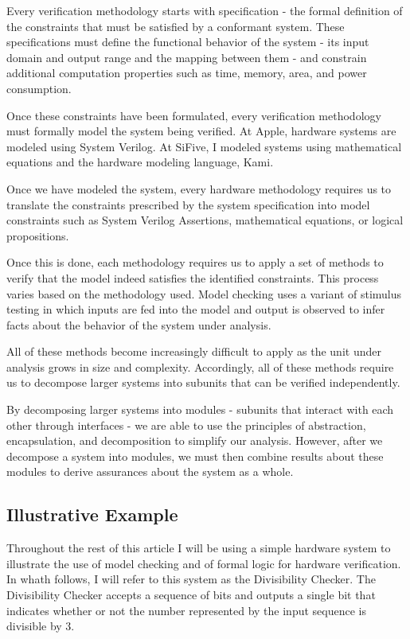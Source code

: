 \documentclass[10pt,a4paper]{article}
\begin{document}
Every verification methodology starts with specification - the formal definition of the constraints that must be satisfied by a conformant system. These specifications must define the functional behavior of the system - its input domain and output range and the mapping between them - and constrain additional computation properties such as time, memory, area, and power consumption.

Once these constraints have been formulated, every verification methodology must formally model the system being verified. At Apple, hardware systems are modeled using System Verilog. At SiFive, I modeled systems using mathematical equations and the hardware modeling language, Kami.

Once we have modeled the system, every hardware methodology requires us to translate the constraints prescribed by the system specification into model constraints such as System Verilog Assertions, mathematical equations, or logical propositions. 

Once this is done, each methodology requires us to apply a set of methods to verify that the model indeed satisfies the identified constraints. This process varies based on the methodology used. Model checking uses a variant of stimulus testing in which inputs are fed into the model and output is observed to infer facts about the behavior of the system under analysis.

All of these methods become increasingly difficult to apply as the unit under analysis grows in size and complexity. Accordingly, all of these methods require us to decompose larger systems into subunits that can be verified independently.

By decomposing larger systems into modules - subunits that interact with each other through interfaces - we are able to use the principles of abstraction, encapsulation, and decomposition to simplify our analysis. However, after we decompose a system into modules, we must then combine results about these modules to derive assurances about the system as a whole.

\subsection{Illustrative Example}

Throughout the rest of this article I will be using a simple hardware system to illustrate the use of model checking and of formal logic for hardware verification. In whath follows, I will refer to this system as the Divisibility Checker. The Divisibility Checker accepts a sequence of bits and outputs a single bit that indicates whether or not the number represented by the input sequence is divisible by 3.
\end{document}
